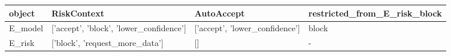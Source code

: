\begin{tabular}{llll}
\toprule
object & RiskContext & AutoAccept & restricted\_from\_E\_risk\_block \\
\midrule
E\_model & ['accept', 'block', 'lower\_confidence'] & ['accept', 'lower\_confidence'] & block \\
E\_risk & ['block', 'request\_more\_data'] & [] & - \\
\bottomrule
\end{tabular}
